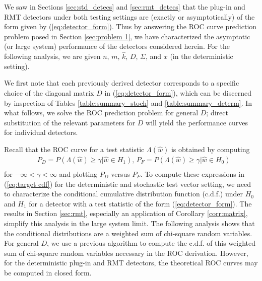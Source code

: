 We saw in Sections \ref{sec:std_detecs} and \ref{sec:rmt_detecs} that the plug-in and RMT detectors under both testing settings are (exactly or asymptotically) of the form given by (\ref{eq:detector_form}). Thus by answering the ROC curve prediction problem posed in Section \ref{sec:problem 1}, we have characterized the asymptotic (or large system) performance of the detectors considered herein. For the following analysis, we are given $n$, $m$, $\widehat{k}$, $D$, $\Sigma$, and $x$ (in the deterministic setting).

We first note that each previously derived detector corresponds to a specific choice of the diagonal matrix $D$ in (\ref{eq:detector_form}), which can be discerned by inspection of Tables \ref{table:summary_stoch} and \ref{table:summary_determ}. In what follows, we solve the ROC prediction problem for general $D$; direct substitution of the relevant parameters for $D$ will yield the performance curves for individual detectors. 

Recall that the ROC curve \cite{fawcett2006introduction} for a test statistic $\Lambda(\widehat{w})$ is obtained by computing
\begin{equation}
\begin{aligned}\label{eq:target cdf}
&P_D = P(\Lambda(\widehat{w}) \geq \gamma| \widehat{w}\in H_1) ,\, P_F = P(\Lambda(\widehat{w}) \geq \gamma| \widehat{w}\in H_0)\\
\end{aligned}
\end{equation}
for $-\infty<\gamma<\infty$ and plotting $P_D$ versus $P_F$. To compute these expressions in (\ref{eq:target cdf}) for the deterministic and stochastic test vector setting, we need to characterize the conditional cumulative distribution function (c.d.f.) under $H_0$ and $H_1$ for a detector with a test statistic of the form (\ref{eq:detector_form}).
The results in Section \ref{sec:rmt}, especially an application of Corollary \ref{corr:matrix}, simplify this analysis in the large system limit. The following analysis shows that the conditional distributions are a weighted sum of chi-square random variables. For general $D$, we use a previous algorithm to compute the c.d.f. of this weighted sum of chi-square random variables necessary in the ROC derivation. However, for the deterministic plug-in and RMT detectors, the theoretical ROC curves may be computed in closed form. 

